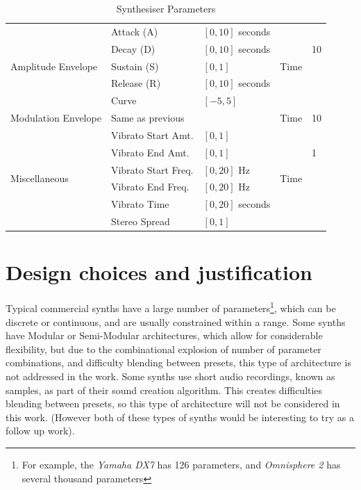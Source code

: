 \documentclass[11pt, oneside]{report}   	%
\begin{document}
\begin{table}[]
\begin{tabular}{|l|l|l|l|l|}
		\multirow{5}{*}{Amplitude Envelope}    & Attack (A)       				& $[0, 10]$ seconds        & \multirow{5}{*}{Time}& \multirow{3}{*}{10} \\
																	  & Decay (D)               		& $[0, 10]$ seconds         &                       			&\\
																	  & Sustain (S)             	 	 & $[0, 1]$                   		&                       			&\\
																	  & Release (R)             		& $[0, 10]$ seconds        &                       			&\\
																	  & Curve                   	   	   & $[-5, 5]$                  	&                       			&\\ \hline
		Modulation Envelope        						& Same as previous           &                            			& Time              	& 10									\\ \hline
		\multirow{6}{*}{Miscellaneous}             & Vibrato Start Amt.    		  & $[0, 1]$                   	& \multirow{6}{*}{Time}& \multirow{3}{*}{1} \\
																	  & Vibrato End Amt.	         & $[0, 1]$                   		&                       			&\\
																	  & Vibrato Start Freq.			  & $[0, 20]$ Hz               &                       			&\\
																	  & Vibrato End Freq.		      & $[0, 20]$ Hz               &                       			&\\
																	  & Vibrato Time            		& $[0, 20]$ seconds      &                       			&\\
																	  & Stereo Spread           	  & $[0, 1]$                   		&                       			&\\ \hline
	\end{tabular}
\caption{Synthesiser Parameters}
\label{tab:Params}
\end{table}

\section{Design choices and justification}\label{sec:SynthDescription}
Typical commercial synths have a large number of parameters\footnote{For example, the \emph{Yamaha DX7} has 126 parameters, and  \emph{Omnisphere 2} has several thousand parameters}, which can be discrete or continuous, and are usually constrained within a range. Some synths have Modular or Semi-Modular architectures, which allow for considerable flexibility, but due to the combinational explosion of number of parameter combinations, and difficulty blending between presets, this type of architecture is not addressed in the work.
Some synths use short audio recordings, known as samples, as part of their sound creation algorithm. This creates difficulties blending between presets, so this type of architecture will not be considered in this work. (However both of these types of synths would be interesting to try as a follow up work).
\end{document}

